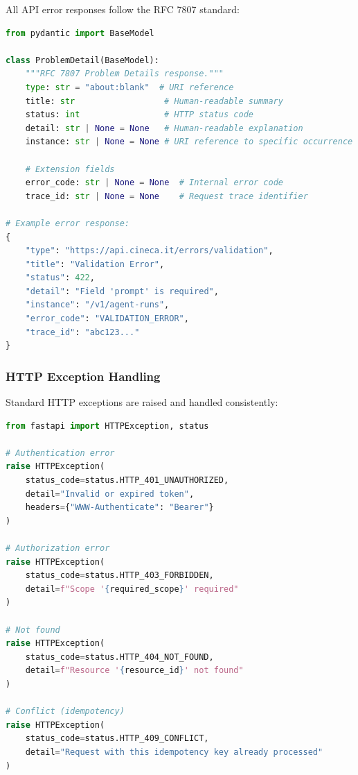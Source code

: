 All API error responses follow the RFC 7807 standard:

\begin{lstlisting}[language=Python, caption={RFC 7807 Problem Details implementation.}]
from pydantic import BaseModel

class ProblemDetail(BaseModel):
    """RFC 7807 Problem Details response."""
    type: str = "about:blank"  # URI reference
    title: str                  # Human-readable summary
    status: int                 # HTTP status code
    detail: str | None = None   # Human-readable explanation
    instance: str | None = None # URI reference to specific occurrence
    
    # Extension fields
    error_code: str | None = None  # Internal error code
    trace_id: str | None = None    # Request trace identifier

# Example error response:
{
    "type": "https://api.cineca.it/errors/validation",
    "title": "Validation Error",
    "status": 422,
    "detail": "Field 'prompt' is required",
    "instance": "/v1/agent-runs",
    "error_code": "VALIDATION_ERROR",
    "trace_id": "abc123..."
}
\end{lstlisting}

\subsubsection{HTTP Exception Handling}

Standard HTTP exceptions are raised and handled consistently:

\begin{lstlisting}[language=Python, caption={HTTP exception raising patterns.}]
from fastapi import HTTPException, status

# Authentication error
raise HTTPException(
    status_code=status.HTTP_401_UNAUTHORIZED,
    detail="Invalid or expired token",
    headers={"WWW-Authenticate": "Bearer"}
)

# Authorization error
raise HTTPException(
    status_code=status.HTTP_403_FORBIDDEN,
    detail=f"Scope '{required_scope}' required"
)

# Not found
raise HTTPException(
    status_code=status.HTTP_404_NOT_FOUND,
    detail=f"Resource '{resource_id}' not found"
)

# Conflict (idempotency)
raise HTTPException(
    status_code=status.HTTP_409_CONFLICT,
    detail="Request with this idempotency key already processed"
)
\end{lstlisting}

